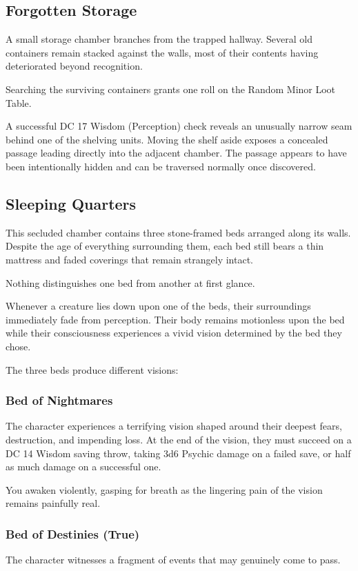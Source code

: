 \subsection*{ Forgotten Storage}
{\entryfont A small storage chamber branches from the trapped hallway. Several old containers remain stacked against the walls, most of their contents having deteriorated beyond recognition.

Searching the surviving containers grants one roll on the Random Minor Loot Table.

A successful DC 17 Wisdom (Perception) check reveals an unusually narrow seam behind one of the shelving units. Moving the shelf aside exposes a concealed passage leading directly into the adjacent chamber. The passage appears to have been intentionally hidden and can be traversed normally once discovered.}

\subsection*{ Sleeping Quarters}
{\entryfont This secluded chamber contains three stone-framed beds arranged along its walls. Despite the age of everything surrounding them, each bed still bears a thin mattress and faded coverings that remain strangely intact.

Nothing distinguishes one bed from another at first glance.

Whenever a creature lies down upon one of the beds, their surroundings immediately fade from perception. Their body remains motionless upon the bed while their consciousness experiences a vivid vision determined by the bed they chose.

The three beds produce different visions:}
\subsubsection*{ Bed of Nightmares}
{\entryfont The character experiences a terrifying vision shaped around their deepest fears, destruction, and impending loss. At the end of the vision, they must succeed on a DC 14 Wisdom saving throw, taking 3d6 Psychic damage on a failed save, or half as much damage on a successful one.}
\begin{DndReadAloud}
	You awaken violently, gasping for breath as the lingering pain of the vision remains painfully real.
\end{DndReadAloud}
\subsubsection*{ Bed of Destinies (True)}
{\entryfont The character witnesses a fragment of events that may genuinely come to pass.}
